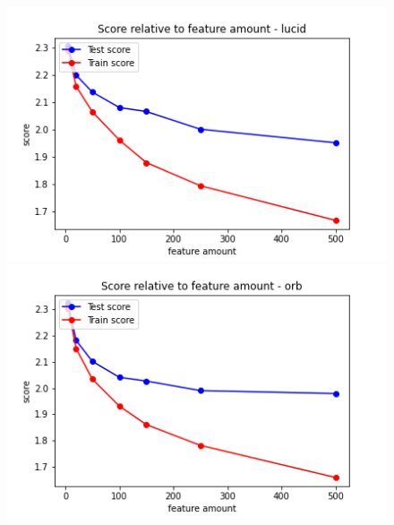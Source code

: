 \begin{figure}[H]
  \centering
  \begin{minipage}[b]{0.4\textwidth}
    \includegraphics[width=\textwidth]{images/2-LBM-feature_amount_lucid_small_values.png}
  \end{minipage}
  \hfill
  \begin{minipage}[b]{0.4\textwidth}
    \includegraphics[width=\textwidth]{images/2-LBM-feature_amount_orb_small_values.png}
  \end{minipage}
\end{figure}

